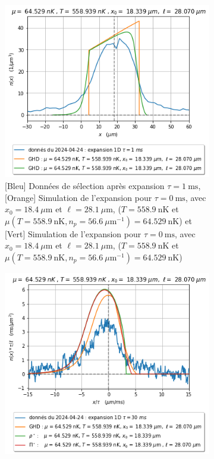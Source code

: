 \documentclass[a3, 10pt,twoside]{article}          %
\theoremstyle{plain}
\theoremstyle{definition}
\theoremstyle{remark}
\theoremstyle{definition} %
\begin{document}
\begin{figure}[H]
    \begin{subfigure}[b]{0.45\textwidth}
        \centering
        \includegraphics[width=\textwidth]{Figures/simul_expansion_1_28}
        \caption{{\color{blue}[Bleu] Données de sélection après expansion $\tau = 1~\text{ms}$}, {\color{orange}[Orange] Simulation de l'expansion pour $\tau = 0~\text{ms}$, avec $x_0 = 18.4~\mu \text{m}$ et $\ell = 28.1~\mu \text{m}$, ($T = 558.9~\text{nK}$ et $\mu(T = 558.9~\text{nK}, n_p = 56.6~\mu \text{m}^{-1}) = 64.529~\text{nK}$)} et {\color{OliveGreen}[Vert] Simulation de l'expansion pour $\tau = 0~\text{ms}$, avec $x_0 = 18.4~\mu \text{m}$ et $\ell = 28.1~\mu \text{m}$, ($T = 558.9~\text{nK}$ et $\mu(T = 558.9~\text{nK}, n_p = 56.6~\mu \text{m}^{-1}) = 64.529~\text{nK}$)}}
        \label{fig:expansion_1_28}
    \end{subfigure}
    \hfill
    \begin{subfigure}[b]{0.45\textwidth}
        \centering
        \includegraphics[width=\textwidth]{Figures/simul_expansion_30_28}

\end{subfigure}
\end{figure}
\end{document}
